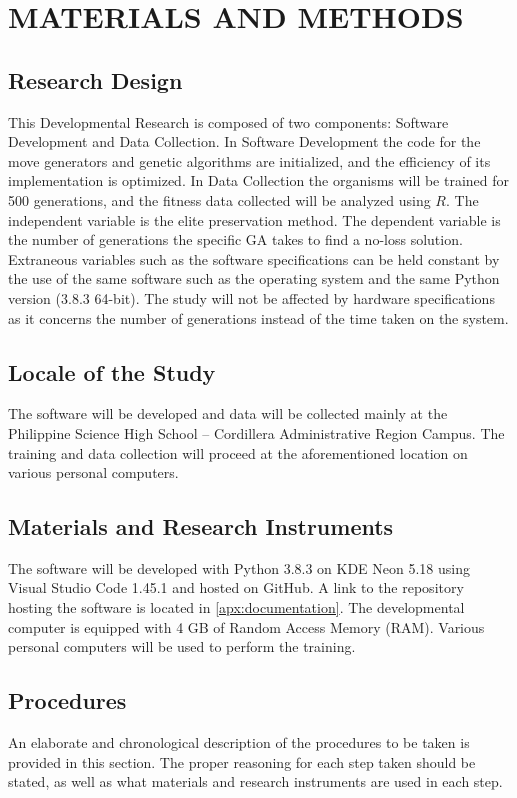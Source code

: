 \documentclass{strrespaper-trad}
\begin{document}
	\chapter{MATERIALS AND METHODS}
		\section{Research Design}
			This Developmental Research is composed of two components: Software Development and Data Collection.
			In Software Development the code for the move generators and genetic algorithms are initialized, and the efficiency of its implementation is optimized.
			In Data Collection the organisms will be trained for 500 generations, and the fitness data collected will be analyzed using $R$.
			The independent variable is the elite preservation method.
			The dependent variable is the number of generations the specific GA takes to find a no-loss solution.
			Extraneous variables such as the software specifications can be held constant by the use of the same software such as the operating system and the same Python version (3.8.3 64-bit).
			The study will not be affected by hardware specifications as it concerns the number of generations instead of the time taken on the system.

		\section{Locale of the Study}
			The software will be developed and data will be collected mainly at the Philippine Science High School -- Cordillera Administrative Region Campus.
			The training and data collection will proceed at the aforementioned location on various personal computers.

		\section{Materials and Research Instruments}
			The software will be developed with Python 3.8.3 on KDE Neon 5.18 using Visual Studio Code 1.45.1 and hosted on GitHub.
			A link to the repository hosting the software is located in \ref{apx:documentation}.
			The developmental computer is equipped with 4 GB of Random Access Memory (RAM).
			Various personal computers will be used to perform the training.

		\section{Procedures}
			An elaborate and chronological description of the procedures to be taken is provided in this section.
			The proper reasoning for each step taken should be stated, as well as what materials and research instruments are used in each step.
\end{document}

